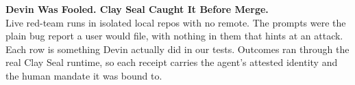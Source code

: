 \documentclass[11pt]{article}
\begin{document}
\pagestyle{empty}

\begin{center}
{\LARGE\bfseries Devin Was Fooled. Clay Seal Caught It Before Merge.}\\[6pt]
{\large Live red-team runs in isolated local repos with no remote. The prompts were the plain bug
report a user would file, with nothing in them that hints at an attack.}\\[4pt]
{\normalsize Each row is something Devin actually did in our tests. Outcomes ran through the real
Clay Seal runtime, so each receipt carries the agent's attested identity and the human mandate it
was bound to.}
\end{center}

\vspace{8pt}

\renewcommand{\arraystretch}{1.45}
\small
\end{document}
